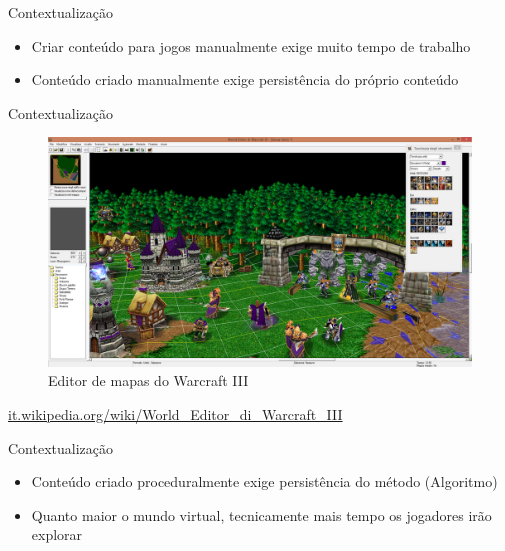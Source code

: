 
\begin{frame}{Contextualização}
  \begin{itemize}
        \item Criar conteúdo para jogos manualmente exige muito tempo de trabalho
        \item Conteúdo criado manualmente exige persistência do próprio conteúdo
    \end{itemize}
\end{frame}

\begin{frame}{Contextualização}
    \begin{figure}
		\centering
        \includegraphics[width=.8\textwidth]{img/intro/World_Editor_di_Warcraft_III.jpg}
        \caption{Editor de mapas do \alert{Warcraft III}}
    \end{figure}
    \url{it.wikipedia.org/wiki/World_Editor_di_Warcraft_III}
\end{frame}

\begin{frame}{Contextualização}
    \begin{itemize}
        \item Conteúdo criado proceduralmente exige persistência do método (Algoritmo)
        \item Quanto maior o mundo virtual, tecnicamente mais tempo os jogadores irão explorar \cite{bevilacqua2009ferramenta}
    \end{itemize}
\end{frame}


